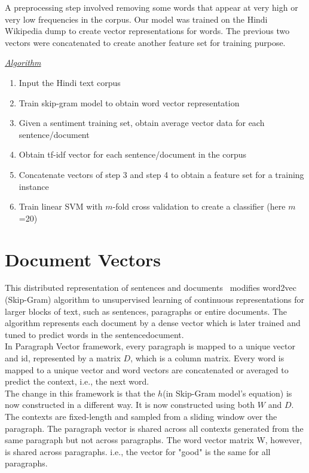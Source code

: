 A preprocessing step involved removing some words that appear at very high or
very low frequencies in the corpus.  
Our model was trained on the Hindi Wikipedia dump to create vector
representations for words. The previous two vectors were concatenated to
create another feature set for training purpose.  

\underline{\emph{Algorithm}}
\begin{enumerate}
\item Input the Hindi text corpus
\item Train skip-gram model to obtain word vector representation
\item Given a sentiment training set, obtain average vector data for each sentence/document
\item Obtain tf-idf vector for each sentence/document in the corpus
\item Concatenate vectors of step 3 and step 4 to obtain a feature set for a training instance
\item Train linear SVM with $m$-fold cross validation to create a classifier
(here $m$=20)
\end{enumerate}

\section{Document Vectors}
This distributed representation of sentences and documents~\cite{Le:14} modifies word2vec (Skip-Gram) algorithm to unsupervised learning of continuous representations for larger blocks of text, such as sentences, paragraphs or entire documents. The algorithm represents each document by a dense vector which is later trained and tuned to predict words in the sentence\/document.\\
In Paragraph Vector framework, every paragraph is mapped to a unique vector and id, represented by a matrix $D$, which is a column matrix. Every word is mapped to a unique vector and word vectors are concatenated or averaged to predict the context, i.e., the next word.\\
The change in this framework is that the $h$(in Skip-Gram model's equation) is now constructed in a different way. It is now constructed using both $W$ and $D$.\\
The contexts are fixed-length and sampled from a sliding window over the paragraph. The paragraph vector is shared across all contexts generated from the same paragraph but not across paragraphs.  The word vector matrix W, however, is shared across paragraphs. i.e., the vector for "good" is the same for all paragraphs.\\

